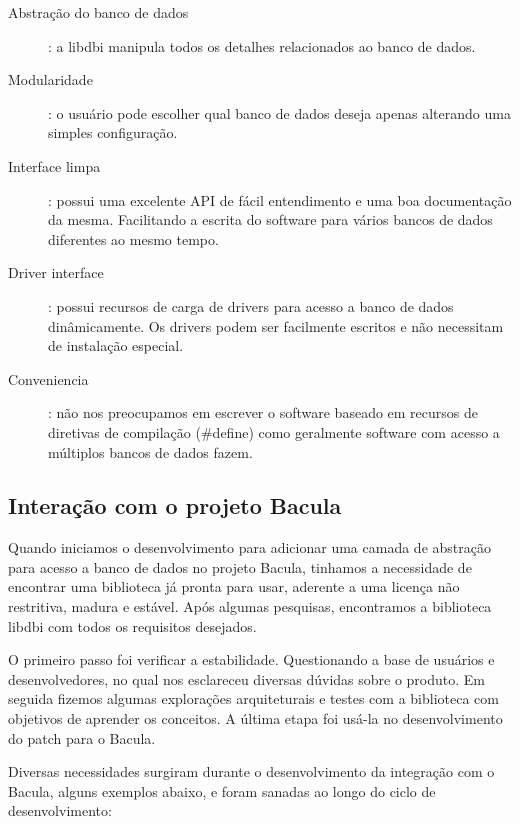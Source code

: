\begin{description}
 \item[Abstração do banco de dados]: a libdbi manipula todos os detalhes relacionados ao banco de dados. 
 \item[Modularidade]: o usuário pode escolher qual banco de dados deseja apenas alterando uma simples configuração.
 \item[Interface limpa]: possui uma excelente API de fácil entendimento e uma boa documentação da mesma. Facilitando a escrita do software para vários bancos de dados diferentes ao mesmo tempo.
 \item[Driver interface]: possui recursos de carga de drivers para acesso a banco de dados dinâmicamente. Os drivers podem ser facilmente escritos e não necessitam de instalação especial.
 \item[Conveniencia]: não nos preocupamos em escrever o software baseado em recursos de diretivas de compilação (\#define) como geralmente software com acesso a múltiplos bancos de dados fazem.
 \end{description}

\subsection{Interação com o projeto Bacula}

Quando iniciamos o desenvolvimento para adicionar uma camada de abstração para acesso a banco de dados no projeto Bacula, tinhamos a necessidade de encontrar uma biblioteca já pronta para usar, aderente a uma licença não restritiva, madura e estável. Após algumas pesquisas, encontramos a biblioteca libdbi com todos os requisitos desejados.

O primeiro passo foi verificar a estabilidade. Questionando a base de usuários e desenvolvedores, no qual nos esclareceu diversas dúvidas sobre o produto. Em seguida fizemos algumas explorações arquiteturais e testes com a biblioteca com objetivos de aprender os conceitos. A última etapa foi usá-la no desenvolvimento do patch para o Bacula.

Diversas necessidades surgiram durante o desenvolvimento da integração com o Bacula, alguns exemplos abaixo, e foram sanadas ao longo do ciclo de desenvolvimento:

